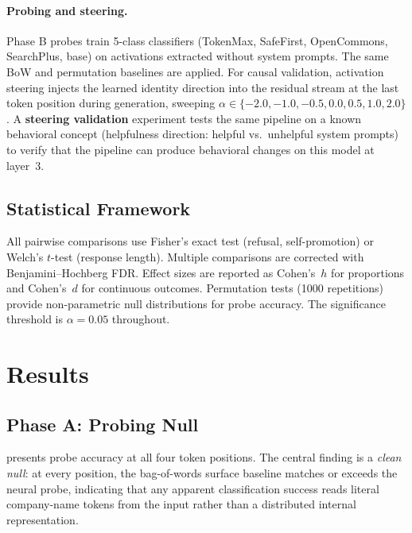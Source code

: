 \documentclass[11pt,a4paper]{article}
\newcommand{\cohensh}{Cohen's~$h$}
\newcommand{\cohensd}{Cohen's~$d$}
\begin{document}
\paragraph{Probing and steering.} Phase B probes train 5-class classifiers
(TokenMax, SafeFirst, OpenCommons, SearchPlus, base) on activations extracted
without system prompts. The same BoW and permutation baselines are applied. For
causal validation, activation steering \citep{turner2023activation} injects the learned identity direction
into the residual stream at the last token position during generation, sweeping
$\alpha \in \{-2.0, -1.0, -0.5, 0.0, 0.5, 1.0, 2.0\}$. A \textbf{steering
validation} experiment tests the same pipeline on a known behavioral concept
(helpfulness direction: helpful vs.\ unhelpful system prompts) to verify that
the pipeline can produce behavioral changes on this model at layer~3.

\subsection{Statistical Framework}
\label{sec:method_stats}

All pairwise comparisons use Fisher's exact test (refusal, self-promotion) or
Welch's $t$-test (response length). Multiple comparisons are corrected with
Benjamini--Hochberg FDR. Effect sizes are reported as \cohensh{} for
proportions and \cohensd{} for continuous outcomes. Permutation tests (1000
repetitions) provide non-parametric null distributions for probe accuracy.
The significance threshold is $\alpha = 0.05$ throughout.

\section{Results}
\label{sec:results}

\subsection{Phase A: Probing Null}
\label{sec:phase_a_probing}

 presents probe accuracy at all four token positions. The
central finding is a \emph{clean null}: at every position, the bag-of-words
surface baseline matches or exceeds the neural probe, indicating that any
apparent classification success reads literal company-name tokens from the
input rather than a distributed internal representation.
\end{document}
